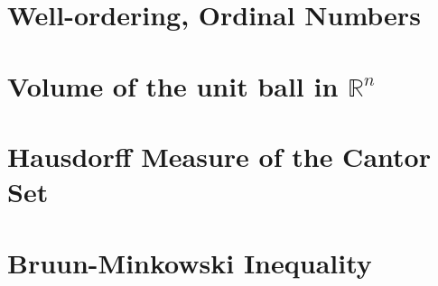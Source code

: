 \documentclass[11pt]{book}
\theoremstyle{definition}
\numberwithin{equation}{chapter}
\begin{document}
\begin{appendices}
\chapter{Well-ordering, Ordinal Numbers}\label{appendix_a}



\chapter{Volume of the unit ball in $\mathbb{R}^n$}\label{appendix_b}



\chapter{Hausdorff Measure of the Cantor Set}\label{appendix_c}



\chapter{Bruun-Minkowski Inequality}\label{appendix_d}




\end{appendices}

\newpage


\end{document}
